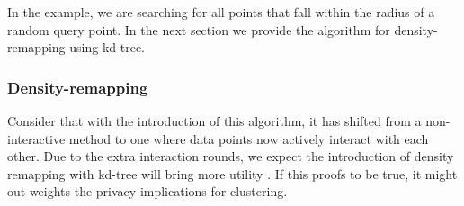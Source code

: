 In the example, we are searching for all points that fall within the radius of a random query point.
In the next section we provide the algorithm for density-remapping using kd-tree.

%

\subsubsection{Density-remapping}


Consider that with the introduction of this algorithm, it has shifted from a non-interactive method to one where data points now actively interact with each other.
Due to the extra interaction rounds, we expect the introduction of density remapping with kd-tree will bring more utility \citep{wang_comprehensive_2020, xiongComprehensiveSurveyLocal2020}.
If this proofs to be true, it might out-weights the privacy implications for clustering. 
%


\newpage

